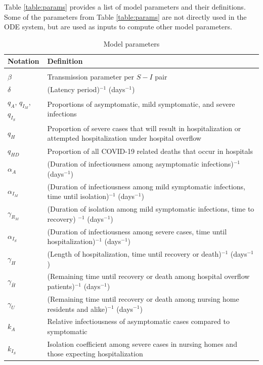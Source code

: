 \documentclass[11pt]{article}
\begin{document}
Table \ref{table:params} provides a list of model parameters and their definitions. Some of the parameters from Table \ref{table:params} are not directly used in the ODE system, but are used as inputs to compute other model parameters. 

\begingroup
\renewcommand\arraystretch{0.5}
\begin{table}[!htb] 
	\caption{Model parameters } 
	\begin{tabular}{p{} p{} }
	Notation & Definition \\\hline\\
	$\beta$ & Transmission parameter per $S-I$ pair \\[0.5em]
	$\delta$ & (Latency period)$^{-1}$ (days$^{-1}$) \\[0.5em]
	$q_A$, $q_{I_M}$, $q_{I_S}$  & Proportions of asymptomatic, mild symptomatic, and severe infections \\[0.5em]
	$q_H$ & Proportion of severe cases that will result in hospitalization or attempted hospitalization under hospital overflow \\ [0.5em]
	$q_{HD}$ & Proportion of all COVID-19 related deaths that occur in hospitals \\ [0.5em]
	$\alpha_A$ & (Duration of infectiousness among asymptomatic infections)$^{-1}$ (days$^{-1}$) \\[0.5em]	
	$\alpha_{I_M}$ & (Duration of infectiousness among mild symptomatic infections, time until isolation)$^{-1}$ (days$^{-1}$) \\[0.5em]
	$\gamma_{R_M}$ & (Duration of isolation among mild symptomatic infections, time to recovery)	$^{-1}$ (days$^{-1}$) \\[0.5em]
	$\alpha_{I_S}$ & (Duration of infectiousness among severe cases, time until hospitalization)$^{-1}$ (days$^{-1}$) \\[0.5em]	
	$\gamma_{H}$ & (Length of hospitalization, time until recovery or death)$^{-1}$ (days$^{-1}$) \\[0.5em]
	$\gamma_{\bar{H}}$ & (Remaining time until recovery or death among hospital overflow patients)$^{-1}$ (days$^{-1}$) \\[0.5em]
	$\gamma_{U}$ & (Remaining time until recovery or death among nursing home residents and alike)$^{-1}$ (days$^{-1}$) \\[0.5em]
	$k_A$ & Relative infectiousness of asymptomatic cases compared to symptomatic \\[0.5em]
	$k_{I_S}$ & Isolation coefficient among severe cases in nursing homes and those expecting hospitalization \\[0.5em]

\end{tabular}
\end{table}
\end{document}
